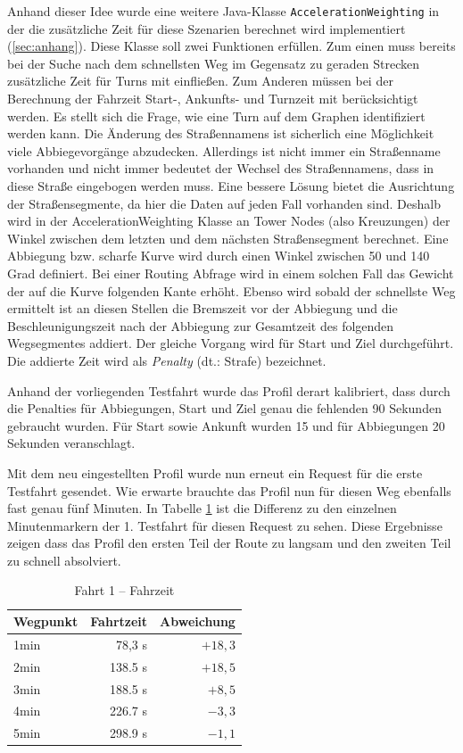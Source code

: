 Anhand dieser Idee wurde eine weitere Java-Klasse \texttt{AccelerationWeighting} in der die zusätzliche Zeit für diese Szenarien berechnet wird implementiert (\ref{sec:anhang}).
Diese Klasse soll zwei Funktionen erfüllen. Zum einen muss bereits bei der Suche nach dem schnellsten Weg im Gegensatz zu geraden Strecken zusätzliche Zeit für Turns mit einfließen. Zum Anderen müssen bei der Berechnung der Fahrzeit Start-, Ankunfts- und Turnzeit mit berücksichtigt werden. 
Es stellt sich die Frage, wie eine Turn auf dem Graphen identifiziert werden kann. Die Änderung des Straßennamens ist sicherlich eine Möglichkeit viele Abbiegevorgänge abzudecken. Allerdings ist nicht immer ein Straßenname vorhanden und nicht immer bedeutet der Wechsel des Straßennamens, dass in diese Straße eingebogen werden muss.
Eine bessere Lösung bietet die Ausrichtung der Straßensegmente, da hier die Daten auf jeden Fall vorhanden sind. Deshalb wird in der AccelerationWeighting Klasse an Tower Nodes (also Kreuzungen) der Winkel zwischen dem letzten und dem nächsten Straßensegment berechnet.
Eine Abbiegung bzw. scharfe Kurve wird durch einen Winkel zwischen 50 und 140 Grad definiert.
Bei einer Routing Abfrage wird in einem solchen Fall das Gewicht der auf die Kurve folgenden Kante erhöht. Ebenso wird sobald der schnellste Weg ermittelt ist an diesen Stellen die Bremszeit vor der Abbiegung und die Beschleunigungszeit nach der Abbiegung zur Gesamtzeit des folgenden Wegsegmentes addiert. Der gleiche Vorgang wird für Start und Ziel durchgeführt. Die addierte Zeit wird als \textit{Penalty} (dt.: Strafe) bezeichnet.

Anhand der vorliegenden Testfahrt wurde das Profil derart kalibriert, dass durch die Penalties für Abbiegungen, Start und Ziel genau die fehlenden 90 Sekunden gebraucht wurden.
Für Start sowie Ankunft wurden 15 und für Abbiegungen 20 Sekunden veranschlagt.

Mit dem neu eingestellten Profil wurde nun erneut ein Request für die erste Testfahrt gesendet. Wie erwarte brauchte das Profil nun für diesen Weg ebenfalls fast genau fünf Minuten.
In Tabelle \ref{tab:drive11} ist die Differenz zu den einzelnen Minutenmarkern der 1. Testfahrt für diesen Request zu sehen. Diese Ergebnisse zeigen dass das Profil den ersten Teil der Route zu langsam und den zweiten Teil zu schnell absolviert.

\begin{table}[h]
\centering
\caption{Fahrt 1 -- Fahrzeit}
\label{tab:drive11}
\begin{tabular}{|l|r|r|}
\hline
Wegpunkt & Fahrtzeit & Abweichung \\ \hline 
1min & 78,3 s & $+18,3$ \\
2min & 138.5 s & $+18,5$ \\
3min & 188.5 s & $+8,5$ \\
4min & 226.7 s & $-3,3$ \\
5min & 298.9 s & $-1,1$ \\
\hline
\end{tabular}
\end{table}

